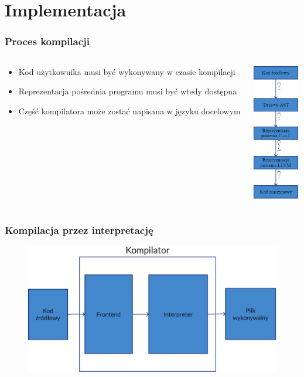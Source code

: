 \section{Implementacja}

\begin{frame}
	\frametitle{Proces kompilacji}

	\begin{columns}
		\begin{column}{0.5\textwidth}
			\begin{itemize}
				\item Kod użytkownika musi być wykonywany w czasie kompilacji
				\item Reprezentacja pośrednia programu musi być wtedy dostępna
				\item Część kompilatora może zostać napisana w języku docelowym
			\end{itemize}
		\end{column}
		\begin{column}{0.5\textwidth}  %
			\begin{center}
			 \includegraphics[height=6cm]{../assets/toplevelcompilationprocess.png}
			 \end{center}
		\end{column}
	\end{columns}
\end{frame}

\begin{frame}
	\frametitle{Kompilacja przez interpretację}

	\begin{figure}
		\includegraphics[width=\textwidth]{../assets/compilerouterdiagram.png}
	\end{figure}

\end{frame}

